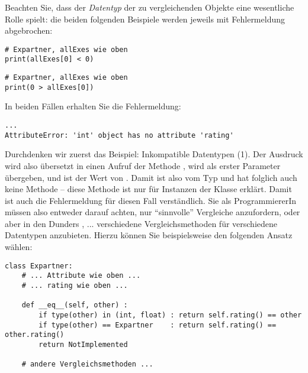 Beachten Sie, dass der \emph{Datentyp} der zu vergleichenden Objekte eine wesentliche Rolle spielt: die beiden folgenden Beispiele werden jeweils mit Fehlermeldung abgebrochen:

\begin{minipage}{.49\linewidth}
\begin{warnbox}[Beispiel: Inkompatible Datentypen (1), leftupper=7mm]
\begin{verbatim}
# Expartner, allExes wie oben
print(allExes[0] < 0)
\end{verbatim}
\end{warnbox}
\end{minipage}
%
\begin{minipage}{.49\linewidth}
\begin{warnbox}[Beispiel: Inkompatible Datentypen (2), leftupper=7mm]
\begin{verbatim}
# Expartner, allExes wie oben
print(0 > allExes[0])
\end{verbatim}
\end{warnbox}
\end{minipage}

In beiden Fällen erhalten Sie die Fehlermeldung:
\begin{cmdbox}
\begin{verbatim}
...
AttributeError: 'int' object has no attribute 'rating'
\end{verbatim}
\end{cmdbox}

Durchdenken wir zuerst das Beispiel: Inkompatible Datentypen (1). Der Ausdruck  wird also übersetzt in einen Aufruf der Methode , \ie {} wird als erster Parameter  übergeben, und  ist der Wert von . Damit ist  also vom Typ  und hat folglich auch keine Methode  -- diese Methode ist nur für Instanzen der Klasse  erklärt. Damit ist auch die Fehlermeldung für diesen Fall verständlich. Sie als ProgrammiererIn müssen also entweder darauf achten, nur \enquote{sinnvolle} Vergleiche anzufordern, oder aber in den Dunders , ... verschiedene Vergleichsmethoden für verschiedene Datentypen anzubieten. Hierzu können Sie beispielsweise den folgenden Ansatz wählen:

\begin{codebox}
\begin{verbatim}
class Expartner:
    # ... Attribute wie oben ...
    # ... rating wie oben ...
    
    def __eq__(self, other) :
        if type(other) in (int, float) : return self.rating() == other
        if type(other) == Expartner    : return self.rating() == other.rating()
        return NotImplemented
    
    # andere Vergleichsmethoden ...
\end{verbatim}
\end{codebox}

